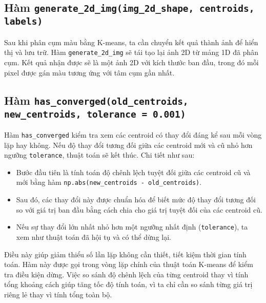 \subsection{Hàm \texttt{generate\_2d\_img(img\_2d\_shape, centroids, labels)}}

Sau khi phân cụm màu bằng K-means, ta cần chuyển kết quả thành ảnh để hiển thị và lưu trữ. Hàm \texttt{generate\_2d\_img} sẽ tái tạo lại ảnh 2D từ mảng 1D đã phân cụm. Kết quả nhận được sẽ là một ảnh 2D với kích thước ban đầu, trong đó mỗi pixel được gán màu tương ứng với tâm cụm gần nhất.

\subsection{Hàm \texttt{has\_converged(old\_centroids, new\_centroids, tolerance = 0.001)}}

Hàm \texttt{has\_converged} kiểm tra xem các centroid có thay đổi đáng kể sau mỗi vòng lặp hay không. Nếu độ thay đổi tương đối giữa các centroid mới và cũ nhỏ hơn ngưỡng \texttt{tolerance}, thuật toán sẽ kết thúc. Chi tiết như sau:
\begin{itemize}
	\item Bước đầu tiên là tính toán độ chênh lệch tuyệt đối giữa các centroid cũ và mới bằng hàm \texttt{np.abs(new\_centroids - old\_centroids)}.
	\item Sau đó, các thay đổi này được chuẩn hóa để biết mức độ thay đổi tương đối so với giá trị ban đầu bằng cách chia cho giá trị tuyệt đối của các centroid cũ.
	\item Nếu sự thay đổi lớn nhất nhỏ hơn một ngưỡng nhất định (\texttt{tolerance}), ta xem như thuật toán đã hội tụ và có thể dừng lại.
\end{itemize}

Điều này giúp giảm thiểu số lần lặp không cần thiết, tiết kiệm thời gian tính toán. Hàm này được gọi trong vòng lặp chính của thuật toán K-means để kiểm tra điều kiện dừng. Việc so sánh độ chênh lệch của từng centroid thay vì tính tổng khoảng cách giúp tăng tốc độ tính toán, vì ta chỉ cần so sánh từng giá trị riêng lẻ thay vì tính tổng toàn bộ.